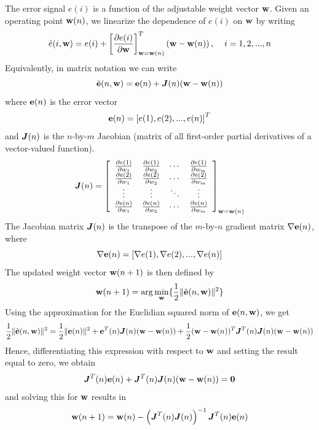 \begin{enumerate}
\begin{solution}
    The error signal $e(i)$ is a function of the adjustable weight vector
    ${\bf{w}}$. Given an operating point ${\bf{w}}(n)$, we linearize the dependence of $e(i)$
    on ${\bf{w}}$ by writing
    \[
    \tilde{e}(i,{\bf{w}})=e(i) + \left[ \frac{\partial e(i)}{\partial {\bf{w}}}
    \right]_{{\bf{w}}={\bf{w}}(n)}^{T} \left(
      {\bf{w}}-{\bf{w}}(n)\right), \hspace{4mm} i=1,2,...,n
    \]
    Equivalently, in matrix notation we can write
    \[
    \tilde{{\bf{e}}}(n,{\bf{w}})={\bf{e}}(n)+\boldsymbol{J}(n)({\bf{w}}-{\bf{w}}(n))
    \]
    where ${\bf{e}}(n)$ is the error vector
    \[
    {\bf{e}}(n)=\left[ e(1), e(2), ... , e(n) \right]^T
    \]
    and $\boldsymbol{J}(n)$ is the $n$-by-$m$ Jacobian (matrix of all
    first-order partial derivatives of a vector-valued function).
    \[
    \boldsymbol{J}(n)=
    \left[ \begin{array}{cccc}
        \frac{\partial e(1)}{\partial w_1} & \frac{\partial e(1)}{\partial w_2} & \cdots & \frac{\partial e(1)}{\partial w_m} \\
        \frac{\partial e(2)}{\partial w_1} & \frac{\partial e(2)}{\partial w_2} & \cdots & \frac{\partial e(2)}{\partial w_m} \\
        \vdots & \vdots & \ddots &  \vdots \\
        \frac{\partial e(n)}{\partial w_1} & \frac{\partial e(n)}{\partial w_2} & \cdots & \frac{\partial e(n)}{\partial w_m} 
      \end{array} \right]_{{\bf{w}}={\bf{w}}(n)}
    \]
    The Jacobian matrix $\boldsymbol{J}(n)$ is the transpose of the $m$-by-$n$ gradient matrix $\nabla {\bf{e}}(n)$, where
    \[
    \nabla {\bf{e}}(n) = \left[ \nabla e(1),\nabla e(2), ... ,\nabla e(n) \right]
    \]
    The updated weight vector ${\bf{w}}(n+1)$ is then defined by
    \[
    {\bf{w}}(n+1)=\arg \min_{{\bf{w}}} \{ \frac{1}{2} \| \tilde{{\bf{e}}}(n,{\bf{w}})\|^2\rbrace
    \]
    Using the approximation for the Euclidian squared norm of
    ${\bf{e}}(n,{\bf{w}})$, we get
    \[
    \frac{1}{2} \| \tilde{{\bf{e}}}(n,{\bf{w}}) \|^2 = \frac{1}{2} \|{\bf{e}}(n)\|^2 + {\bf{e}}^T(n)\boldsymbol{J}(n)({\bf{w}}-{\bf{w}}(n)) + \frac{1}{2}({\bf{w}}-{\bf{w}}(n))^T\boldsymbol{J}^T(n)\boldsymbol{J}(n)({\bf{w}}-{\bf{w}}(n))
    \]
    Hence, differentiating this expression with respect to ${\bf{w}}$ and setting the result equal to zero, we obtain
    \[
    \boldsymbol{J}^T(n){\bf{e}}(n) + \boldsymbol{J}^T(n)\boldsymbol{J}(n)({\bf{w}}-{\bf{w}}(n))={\bf{0}}
    \]
    and solving this for ${\bf{w}}$ results in
    \[
    {\bf{w}}(n+1) = {\bf{w}}(n) - \left(\boldsymbol{J}^T(n)\boldsymbol{J}(n)\right)^{-1}\boldsymbol{J}^T(n){\bf{e}}(n)
    \]


\end{solution}
\end{enumerate}
